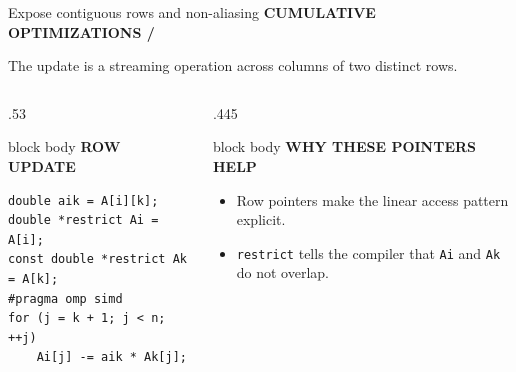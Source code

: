 \documentclass[aspectratio=169,10pt]{beamer}
\newcommand{\eyebrow}[1]{%
  {\color{cyan}\scriptsize\bfseries #1}\par\vspace{.08cm}}
\newcommand{\smallmuted}[1]{{\color{muted}\small #1}}
\newcommand{\cardtitle}[2]{%
  {\color{#1}\bfseries\small #2}\par\vspace{.08cm}}
\begin{document}
\begin{frame}[fragile]{Expose contiguous rows and non-aliasing}
  \eyebrow{CUMULATIVE OPTIMIZATIONS \quad / }
  {\smallmuted{The update is a streaming operation across columns of two distinct rows.}}
  \vspace{.1cm}

  \begin{columns}[T,onlytextwidth]
    \begin{column}{.53\textwidth}
      \begin{beamercolorbox}[rounded=true,sep=.22cm,wd=\textwidth]{block body}
        \cardtitle{cyan}{ROW UPDATE}
        \begin{center}
        \end{center}
\begin{lstlisting}
double aik = A[i][k];
double *restrict Ai = A[i];
const double *restrict Ak = A[k];
#pragma omp simd
for (j = k + 1; j < n; ++j)
    Ai[j] -= aik * Ak[j];
\end{lstlisting}
      \end{beamercolorbox}
    \end{column}
    \begin{column}{.445\textwidth}
      \begin{beamercolorbox}[rounded=true,sep=.22cm,wd=\textwidth]{block body}
        \cardtitle{lavender}{WHY THESE POINTERS HELP}
        \begin{itemize}
          \item Row pointers make the linear access pattern explicit.
          \item \texttt{restrict} tells the compiler that \texttt{Ai} and
                \texttt{Ak} do not overlap.

\end{itemize}
\end{beamercolorbox}
\end{column}
\end{columns}
\end{frame}
\end{document}
